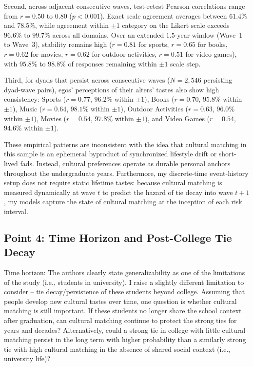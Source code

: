 \documentclass[11pt]{article}
\begin{document}
Second, across adjacent consecutive waves, test-retest Pearson correlations range from $r = 0.50$ to $0.80$ ($p < 0.001$). Exact scale agreement averages between $61.4\%$ and $78.5\%$, while agreement within $\pm 1$ category on the Likert scale exceeds $96.6\%$ to $99.7\%$ across all domains. Over an extended $1.5$-year window (Wave~1 to Wave~3), stability remains high ($r = 0.81$ for sports, $r = 0.65$ for books, $r = 0.62$ for movies, $r = 0.62$ for outdoor activities, $r = 0.51$ for video games), with $95.8\%$ to $98.8\%$ of responses remaining within $\pm 1$ scale step.

Third, for dyads that persist across consecutive waves ($N = 2,546$ persisting dyad-wave pairs), egos' perceptions of their alters' tastes also show high consistency: Sports ($r = 0.77$, $96.2\%$ within $\pm 1$), Books ($r = 0.70$, $95.8\%$ within $\pm 1$), Music ($r = 0.64$, $98.1\%$ within $\pm 1$), Outdoor Activities ($r = 0.63$, $96.0\%$ within $\pm 1$), Movies ($r = 0.54$, $97.8\%$ within $\pm 1$), and Video Games ($r = 0.54$, $94.6\%$ within $\pm 1$).

These empirical patterns are inconsistent with the idea that cultural matching in this sample is an ephemeral byproduct of synchronized lifestyle drift or short-lived fads. Instead, cultural preferences operate as durable personal anchors throughout the undergraduate years. Furthermore, my discrete-time event-history setup does not require static lifetime tastes: because cultural matching is measured dynamically at wave $t$ to predict the hazard of tie decay into wave $t+1$, my models capture the state of cultural matching at the inception of each risk interval.

\subsection*{Point 4: Time Horizon and Post-College Tie Decay}

\begin{reviewercomment}
Time horizon: The authors clearly state generalizability as one of the limitations of the study (i.e., students in university). I raise a slightly different limitation to consider -- tie decay/persistence of these students beyond college. Assuming that people develop new cultural tastes over time, one question is whether cultural matching is still important. If these students no longer share the school context after graduation, can cultural matching continue to protect the strong ties for years and decades? Alternatively, could a strong tie in college with little cultural matching persist in the long term with higher probability than a similarly strong tie with high cultural matching in the absence of shared social context (i.e., university life)?
\end{reviewercomment}
\end{document}
